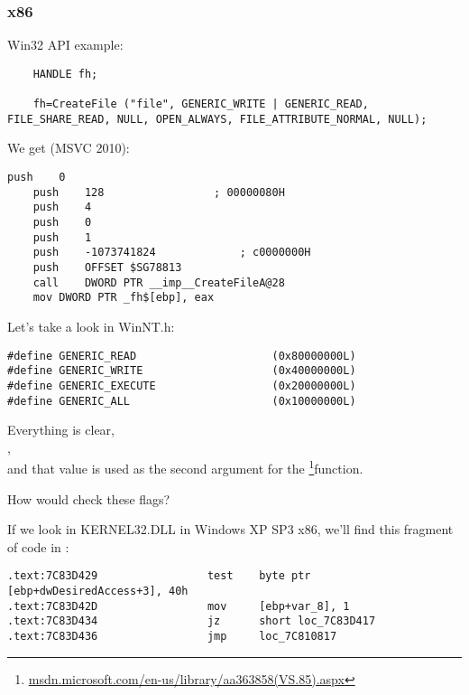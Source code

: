 \subsubsection{x86}

Win32 API example:

\begin{lstlisting}
	HANDLE fh;

	fh=CreateFile ("file", GENERIC_WRITE | GENERIC_READ, FILE_SHARE_READ, NULL, OPEN_ALWAYS, FILE_ATTRIBUTE_NORMAL, NULL);
\end{lstlisting}

We get (MSVC 2010):

\begin{lstlisting}[caption=MSVC 2010]
	push	0
	push	128					; 00000080H
	push	4
	push	0
	push	1
	push	-1073741824				; c0000000H
	push	OFFSET $SG78813
	call	DWORD PTR __imp__CreateFileA@28
	mov	DWORD PTR _fh$[ebp], eax
\end{lstlisting}

Let's take a look in WinNT.h:

\begin{lstlisting}[caption=WinNT.h]
#define GENERIC_READ                     (0x80000000L)
#define GENERIC_WRITE                    (0x40000000L)
#define GENERIC_EXECUTE                  (0x20000000L)
#define GENERIC_ALL                      (0x10000000L)
\end{lstlisting}

Everything is clear,\\
,\\
and that value is used as the second argument for the \footnote{\href{http://go.yurichev.com/17065}{msdn.microsoft.com/en-us/library/aa363858(VS.85).aspx}}function.

How would  check these flags?

If we look in KERNEL32.DLL in Windows XP SP3 x86, we'll find this fragment of code in :

\begin{lstlisting}[caption=KERNEL32.DLL (Windows XP SP3 x86)]
.text:7C83D429                 test    byte ptr [ebp+dwDesiredAccess+3], 40h
.text:7C83D42D                 mov     [ebp+var_8], 1
.text:7C83D434                 jz      short loc_7C83D417
.text:7C83D436                 jmp     loc_7C810817
\end{lstlisting}

